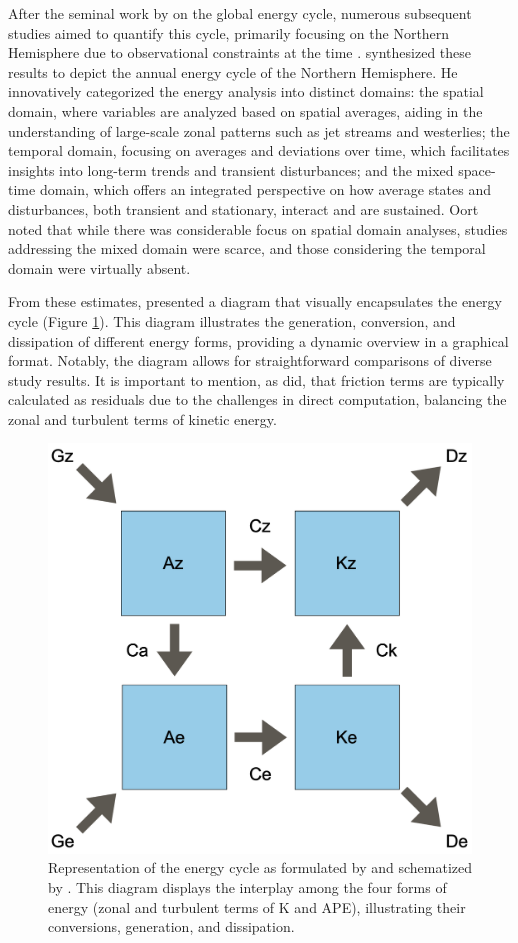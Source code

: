After the seminal work by \citet{lorenz1955} on the global energy cycle, numerous subsequent studies aimed to quantify this cycle, primarily focusing on the Northern Hemisphere due to observational constraints at the time \citep[e.g.]{starr1959further, saltzman1961further, holopainen1964investigation, jensen1961energy, brown1964diagnostic, wiin1959study}. \citet{oort1964estimates} synthesized these results to depict the annual energy cycle of the Northern Hemisphere. He innovatively categorized the energy analysis into distinct domains: the spatial domain, where variables are analyzed based on spatial averages, aiding in the understanding of large-scale zonal patterns such as jet streams and westerlies; the temporal domain, focusing on averages and deviations over time, which facilitates insights into long-term trends and transient disturbances; and the mixed space-time domain, which offers an integrated perspective on how average states and disturbances, both transient and stationary, interact and are sustained. Oort noted that while there was considerable focus on spatial domain analyses, studies addressing the mixed domain were scarce, and those considering the temporal domain were virtually absent.

From these estimates, \citet{oort1964estimates} presented a diagram that visually encapsulates the energy cycle (Figure \ref{LEC_simples}). This diagram illustrates the generation, conversion, and dissipation of different energy forms, providing a dynamic overview in a graphical format. Notably, the diagram allows for straightforward comparisons of diverse study results. It is important to mention, as \citet{oort1964estimates} did, that friction terms are typically calculated as residuals due to the challenges in direct computation, balancing the zonal and turbulent terms of kinetic energy.

\begin{figure}[h]
\begin{center}
\setcaptionmargin{1cm}
\includegraphics[width=0.5 \columnwidth,angle=0]{fig/LEC_simples.png}
\caption[Energy Cycle - Lorenz]{Representation of the energy cycle as formulated by \citet{lorenz1955} and schematized by \citet{oort1964estimates}. This diagram displays the interplay among the four forms of energy (zonal and turbulent terms of K and APE), illustrating their conversions, generation, and dissipation.}
\label{LEC_simples}
\end{center}
\end{figure}

